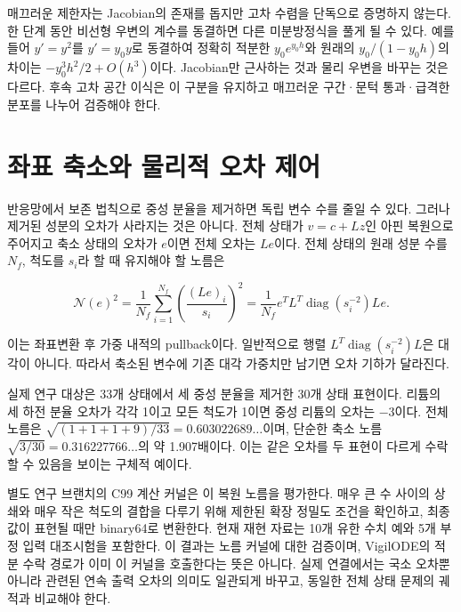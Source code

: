 \documentclass[
  10pt,
  a4paper,
]{article}
\begin{document}
매끄러운 제한자는 Jacobian의 존재를 돕지만 고차 수렴을 단독으로 증명하지
않는다. 한 단계 동안 비선형 우변의 계수를 동결하면 다른 미분방정식을
풀게 될 수 있다. 예를 들어 \(y'=y^2\)를 \(y'=y_0y\)로 동결하여 정확히
적분한 \(y_0e^{y_0h}\)와 원래의 \(y_0/(1-y_0h)\)의 차이는
\(-y_0^3h^2/2+O(h^3)\)이다. Jacobian만 근사하는 것과 물리 우변을 바꾸는
것은 다르다. 후속 고차 공간 이식은 이 구분을 유지하고 매끄러운 구간·문턱
통과·급격한 분포를 나누어 검증해야 한다.

\hypertarget{uxc88cuxd45c-uxcd95uxc18cuxc640-uxbb3cuxb9acuxc801-uxc624uxcc28-uxc81cuxc5b4}{%
\section{좌표 축소와 물리적 오차
제어}\label{uxc88cuxd45c-uxcd95uxc18cuxc640-uxbb3cuxb9acuxc801-uxc624uxcc28-uxc81cuxc5b4}}

반응망에서 보존 법칙으로 중성 분율을 제거하면 독립 변수 수를 줄일 수
있다. 그러나 제거된 성분의 오차가 사라지는 것은 아니다. 전체 상태가
\(v=c+Lz\)인 아핀 복원으로 주어지고 축소 상태의 오차가 \(e\)이면 전체
오차는 \(Le\)이다. 전체 상태의 원래 성분 수를 \(N_f\), 척도를 \(s_i\)라
할 때 유지해야 할 노름은

\[
\mathcal N(e)^2=\frac1{N_f}\sum_{i=1}^{N_f}
\left(\frac{(Le)_i}{s_i}\right)^2
=\frac1{N_f}e^TL^T\operatorname{diag}(s_i^{-2})Le.
\]

이는 좌표변환 후 가중 내적의 pullback이다. 일반적으로 행렬
\(L^T\operatorname{diag}(s_i^{-2})L\)은 대각이 아니다. 따라서 축소된
변수에 기존 대각 가중치만 남기면 오차 기하가 달라진다.

실제 연구 대상은 33개 상태에서 세 중성 분율을 제거한 30개 상태 표현이다.
리튬의 세 하전 분율 오차가 각각 1이고 모든 척도가 1이면 중성 리튬의
오차는 \(-3\)이다. 전체 노름은
\(\sqrt{(1+1+1+9)/33}=0.603022689\ldots\)이며, 단순한 축소 노름
\(\sqrt{3/30}=0.316227766\ldots\)의 약 1.907배이다. 이는 같은 오차를 두
표현이 다르게 수락할 수 있음을 보이는 구체적 예이다.

별도 연구 브랜치의 C99 계산 커널은 이 복원 노름을 평가한다. 매우 큰 수
사이의 상쇄와 매우 작은 척도의 결합을 다루기 위해 제한된 확장 정밀도
조건을 확인하고, 최종 값이 표현될 때만 binary64로 변환한다. 현재 재현
자료는 10개 유한 수치 예와 5개 부정 입력 대조시험을 포함한다. 이 결과는
노름 커널에 대한 검증이며, VigilODE의 적분 수락 경로가 이미 이 커널을
호출한다는 뜻은 아니다. 실제 연결에서는 국소 오차뿐 아니라 관련된 연속
출력 오차의 의미도 일관되게 바꾸고, 동일한 전체 상태 문제의 궤적과
비교해야 한다.
\end{document}
